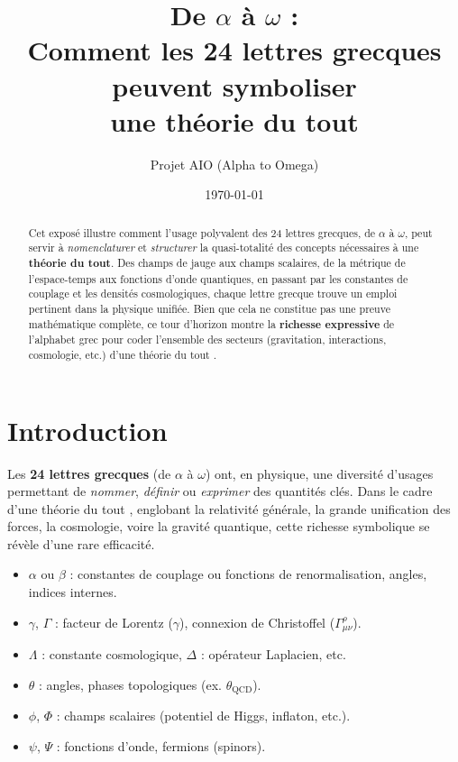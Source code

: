 \documentclass[12pt]{article}
\title{\textbf{De \(\alpha\) à \(\omega\) :}\\
Comment les 24 lettres grecques peuvent symboliser\\
une \og théorie du tout \fg}
\author{Projet AIO (Alpha to Omega)}
\date{\today}
\begin{document}
\maketitle

\begin{abstract}
Cet exposé illustre comment l'usage polyvalent des 24 lettres grecques, 
de \(\alpha\) à \(\omega\), peut servir à \emph{nomenclaturer} et \emph{structurer} 
la quasi-totalité des concepts nécessaires à une \textbf{théorie du tout}. 
Des champs de jauge aux champs scalaires, de la métrique de l'espace-temps 
aux fonctions d'onde quantiques, en passant par les constantes de couplage et 
les densités cosmologiques, chaque lettre grecque trouve un emploi pertinent 
dans la physique unifiée. Bien que cela ne constitue pas une preuve mathématique complète, 
ce tour d'horizon montre la \textbf{richesse expressive} de l'alphabet grec 
pour coder l'ensemble des secteurs (gravitation, interactions, cosmologie, etc.) 
d'une \og théorie du tout \fg. 
\end{abstract}

\tableofcontents

\section{Introduction}

Les \textbf{24 lettres grecques} (de \(\alpha\) à \(\omega\)) ont, en physique, 
une diversité d'usages permettant de \emph{nommer}, \emph{définir} ou \emph{exprimer} 
des quantités clés. Dans le cadre d'une \og théorie du tout \fg, englobant 
la relativité générale, la grande unification des forces, la cosmologie, 
voire la gravité quantique, cette richesse symbolique se révèle d'une rare efficacité.

\begin{itemize}
    \item \(\alpha\) ou \(\beta\) : constantes de couplage ou fonctions de renormalisation, 
          angles, indices internes.
    \item \(\gamma\), \(\Gamma\) : facteur de Lorentz (\(\gamma\)), connexion de Christoffel (\(\Gamma^\rho_{\mu\nu}\)).
    \item \(\Lambda\) : constante cosmologique, 
          \(\Delta\) : opérateur Laplacien, etc.
    \item \(\theta\) : angles, phases topologiques (ex. \(\theta_{\text{QCD}}\)).
    \item \(\phi\), \(\Phi\) : champs scalaires (potentiel de Higgs, inflaton, etc.).
    \item \(\psi\), \(\Psi\) : fonctions d'onde, fermions (spinors).
\end{itemize}
\end{document}
